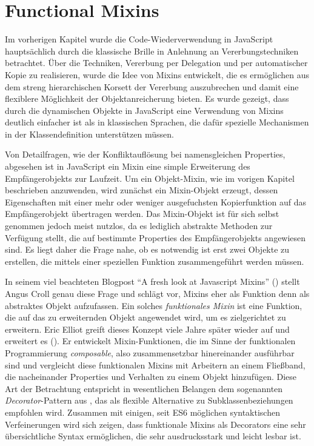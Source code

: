 
\section{Functional Mixins}

Im vorherigen Kapitel wurde die Code-Wiederverwendung in JavaScript hauptsächlich durch die klassische Brille in Anlehnung an Vererbungstechniken betrachtet. Über die Techniken, Vererbung per Delegation und per automatischer Kopie zu realisieren, wurde die Idee von Mixins entwickelt, die es ermöglichen aus dem streng hierarchischen Korsett der Vererbung auszubrechen und damit eine flexiblere Möglichkeit der Objektanreicherung bieten. Es wurde gezeigt, dass durch die dynamischen Objekte in JavaScript eine Verwendung von Mixins deutlich einfacher ist als in klassischen Sprachen, die dafür spezielle Mechanismen in der Klassendefinition unterstützen müssen.

Von Detailfragen, wie der Konfliktauflösung bei namensgleichen Properties, abgesehen ist in JavaScript ein Mixin eine simple Erweiterung des Empfängerobjekts zur Laufzeit. Um ein Objekt-Mixin, wie im vorigen Kapitel beschrieben anzuwenden, wird zunächst ein Mixin-Objekt erzeugt, dessen Eigenschaften mit einer mehr oder weniger ausgefuchsten Kopierfunktion auf das Empfängerobjekt übertragen werden. Das Mixin-Objekt ist für sich selbst genommen jedoch meist nutzlos, da es lediglich abstrakte Methoden zur Verfügung stellt, die auf bestimmte Properties des Empfängerobjekts angewiesen sind. Es liegt daher die Frage nahe, ob es notwendig ist erst zwei Objekte zu erstellen, die mittels einer speziellen Funktion zusammengeführt werden müssen.

In seinem viel beachteten Blogpost "`A fresh look at Javascript Mixins"' (\citep{CrollfreshlookJavaScript2011}) stellt Angus Croll genau diese Frage und schlägt vor, Mixins eher als Funktion denn als abstraktes Objekt aufzufassen. Ein solches \emph{funktionales Mixin} ist eine Funktion, die auf das zu erweiternden Objekt angewendet wird, um es zielgerichtet zu erweitern. Eric Elliot greift dieses Konzept viele Jahre später wieder auf und erweitert es (\citep{ElliottFunctionalMixins2017}). Er entwickelt Mixin-Funktionen, die im Sinne der funktionalen Programmierung \emph{composable}, also zusammensetzbar hinereinander ausführbar sind und vergleicht diese funktionalen Mixins mit Arbeitern an einem Fließband, die nacheinander Properties und Verhalten zu einem Objekt hinzufügen. Diese Art der Betrachtung entspricht in wesentlichen Belangen dem sogenannten \emph{Decorator}-Pattern aus \citep[p. 169]{GoF}, das als flexible Alternative zu Subklassenbeziehungen empfohlen wird. Zusammen mit einigen, seit ES6 möglichen syntaktischen Verfeinerungen wird sich zeigen, dass funktionale Mixins als Decorators eine sehr übersichtliche Syntax ermöglichen, die sehr ausdrucksstark und leicht lesbar ist.

